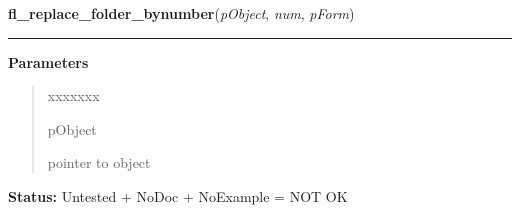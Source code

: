\hspace{.8\funcindent}\begin{boxedminipage}{\funcwidth}

    \raggedright \textbf{fl\_replace\_folder\_bynumber}(\textit{pObject}, \textit{num}, \textit{pForm})

    \vspace{-1.5ex}

    \rule{\textwidth}{0.5\fboxrule}
\setlength{\parskip}{2ex}
\setlength{\parskip}{1ex}
      \textbf{Parameters}
      \vspace{-1ex}

      \begin{quote}
        \begin{Ventry}{xxxxxxx}

          \item[pObject]

          pointer to object

        \end{Ventry}

      \end{quote}

\textbf{Status:} Untested + NoDoc + NoExample = NOT OK



    \end{boxedminipage}

    \label{xformslib:library:fl_set_tabfolder_autofit}

    \vspace{0.5ex}

